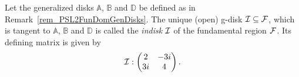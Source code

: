 \begin{definition}
\label{dfn_PSL2Indisk}
Let the generalized disks $\mathbb{A}$, $\mathbb{B}$ and $\mathbb{D}$ be defined as in Remark~\ref{rem_PSL2FunDomGenDisks}. The unique (open) g-disk $\mathcal{I} \subseteq \mathcal{F}$, which is tangent to $\mathbb{A}$, $\mathbb{B}$ and $\mathbb{D}$ is called the \emph{indisk} $\mathcal{I}$ of the fundamental region $\mathcal{F}$. Its defining matrix is given by
\begin{equation}
\label{eqn_PSL2Indisk}
\mathcal{I} : \begin{pmatrix}2 & -3i \\ 3i & 4\end{pmatrix}.
\end{equation}
\end{definition}

